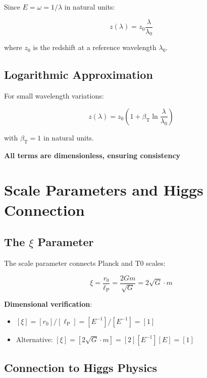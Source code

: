 \documentclass[12pt,a4paper]{article}
\newcommand{\betaT}{\beta_{\text{T}}}
\newcommand{\lP}{\ell_{\text{P}}}
\begin{document}
	Since $E = \omega = 1/\lambda$ in natural units:
	
	\begin{equation}
		\label{eq:wavelength_dependence}
		z(\lambda) = z_0 \frac{\lambda}{\lambda_0}
	\end{equation}
	
	where $z_0$ is the redshift at a reference wavelength $\lambda_0$.
	
	\subsection{Logarithmic Approximation}
	\label{subsec:logarithmic_approximation}
	
	For small wavelength variations:
	
	\begin{equation}
		\label{eq:logarithmic_redshift}
		z(\lambda) = z_0\left(1 + \betaT \ln\frac{\lambda}{\lambda_0}\right)
	\end{equation}
	
	with $\betaT = 1$ in natural units.
	
	\textbf{All terms are dimensionless, ensuring consistency} \checkmark
	
	\section{Scale Parameters and Higgs Connection}
	\label{sec:scale_parameters}
	
	\subsection{The $\xi$ Parameter}
	\label{subsec:xi_parameter}
	
	The scale parameter connects Planck and T0 scales:
	
	\begin{equation}
		\label{eq:xi_definition}
		\xi = \frac{r_0}{\lP} = \frac{2Gm}{\sqrt{G}} = 2\sqrt{G} \cdot m
	\end{equation}
	
	\textbf{Dimensional verification}:
	\begin{itemize}
		\item $[\xi] = [r_0]/[\lP] = [E^{-1}]/[E^{-1}] = [1]$ \checkmark
		\item Alternative: $[\xi] = [2\sqrt{G} \cdot m] = [2][E^{-1}][E] = [1]$ \checkmark
	\end{itemize}
	
	\subsection{Connection to Higgs Physics}
	\label{subsec:higgs_connection}
	
\end{document}
